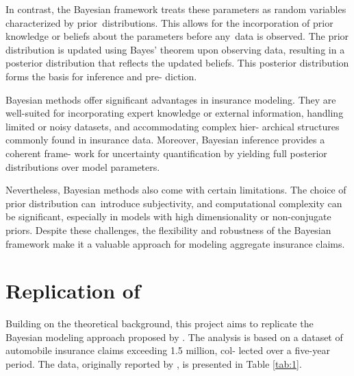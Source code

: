\documentclass{Class/julia}
\begin{document}
In contrast, the Bayesian framework treats these parameters as random variables characterized by prior~distributions. This allows for the incorporation of prior knowledge or beliefs about the parameters before any~data is observed. The prior distribution is updated using Bayes' theorem upon observing data, resulting in a posterior distribution that reflects the updated beliefs. This posterior distribution forms the basis for inference and pre- diction.

Bayesian methods offer significant advantages in insurance modeling. They are well-suited for incorporating expert knowledge or external information, handling limited or noisy datasets, and accommodating complex hier- archical structures commonly found in insurance data. Moreover, Bayesian inference provides a coherent frame- work for uncertainty quantification by yielding full posterior distributions over model parameters.

Nevertheless, Bayesian methods also come with certain limitations. The choice of prior distribution can~introduce subjectivity, and computational complexity can be significant, especially in models with high dimensionality or non-conjugate priors. Despite these challenges, the flexibility and robustness of the Bayesian framework make it a valuable approach for modeling aggregate insurance claims.

\section{Replication of \citet{dudley2006bayesian}}

Building on the theoretical background, this project aims to replicate the Bayesian modeling approach proposed by \citet{dudley2006bayesian}. The analysis is based on a dataset of automobile insurance claims exceeding 1.5 million, col- lected over a five-year period. The data, originally reported by \citet{rytgaard1990pareto}, is presented in Table \ref{tab:1}.
\end{document}
